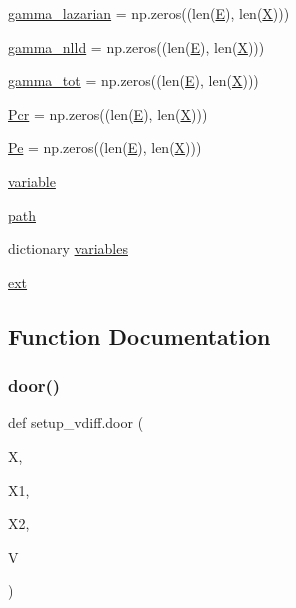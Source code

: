 \begin{DoxyCompactItemize}
\item 
\hyperlink{namespacesetup__vdiff_a41ce2a011346f04ee07aae2c33825dc3}{gamma\+\_\+lazarian} = np.\+zeros((len(\hyperlink{namespacesetup__vdiff_a7780682c76ff3896106f4045b64e582a}{E}), len(\hyperlink{namespacesetup__vdiff_a2d0381db5d912bb072d7cfa7c997de97}{X})))
\item 
\hyperlink{namespacesetup__vdiff_abc643cc371c5d15683fba13bac645ac9}{gamma\+\_\+nlld} = np.\+zeros((len(\hyperlink{namespacesetup__vdiff_a7780682c76ff3896106f4045b64e582a}{E}), len(\hyperlink{namespacesetup__vdiff_a2d0381db5d912bb072d7cfa7c997de97}{X})))
\item 
\hyperlink{namespacesetup__vdiff_a6979eb4486494f914d0010f2512864ac}{gamma\+\_\+tot} = np.\+zeros((len(\hyperlink{namespacesetup__vdiff_a7780682c76ff3896106f4045b64e582a}{E}), len(\hyperlink{namespacesetup__vdiff_a2d0381db5d912bb072d7cfa7c997de97}{X})))
\item 
\hyperlink{namespacesetup__vdiff_a0b7b3be5a33c6732d5545a373f6aa29d}{Pcr} = np.\+zeros((len(\hyperlink{namespacesetup__vdiff_a7780682c76ff3896106f4045b64e582a}{E}), len(\hyperlink{namespacesetup__vdiff_a2d0381db5d912bb072d7cfa7c997de97}{X})))
\item 
\hyperlink{namespacesetup__vdiff_a582f216db715ff78bb612a997fdb3bf5}{Pe} = np.\+zeros((len(\hyperlink{namespacesetup__vdiff_a7780682c76ff3896106f4045b64e582a}{E}), len(\hyperlink{namespacesetup__vdiff_a2d0381db5d912bb072d7cfa7c997de97}{X})))
\item 
\hyperlink{namespacesetup__vdiff_a7d4b35e9140f2b7391c55899526fbf25}{variable}
\item 
\hyperlink{namespacesetup__vdiff_a3ddcea8137546394c8342e42b81a505e}{path}
\item 
dictionary \hyperlink{namespacesetup__vdiff_a8c8ef0ea72f6cd2c490127eb0e62757f}{variables}
\item 
\hyperlink{namespacesetup__vdiff_a07410a97a3fdb01f92826318c5c9ba24}{ext}
\end{DoxyCompactItemize}


\subsection{Function Documentation}
\mbox{\label{namespacesetup__vdiff_a3514bc0bda9acf16aa13843a1d9d6918}} 
\subsubsection{\texorpdfstring{door()}{door()}}
{\footnotesize\ttfamily def setup\+\_\+vdiff.\+door (\begin{DoxyParamCaption}\item[{}]{X,  }\item[{}]{X1,  }\item[{}]{X2,  }\item[{}]{V }\end{DoxyParamCaption})}

